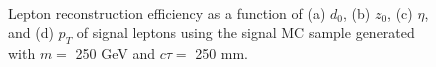 \begin{figure}[!htb]
    \centering
     \\
    \caption{Lepton reconstruction efficiency as a function of (a) $d_{0}$, (b) $z_{0}$, (c) $\eta$, and (d) $p_{T}$ of signal leptons using the signal MC sample generated with $m=$ 250 GeV and $c\tau=$ 250 mm.}
    \label{fig:lepton_eff}
\end{figure}

